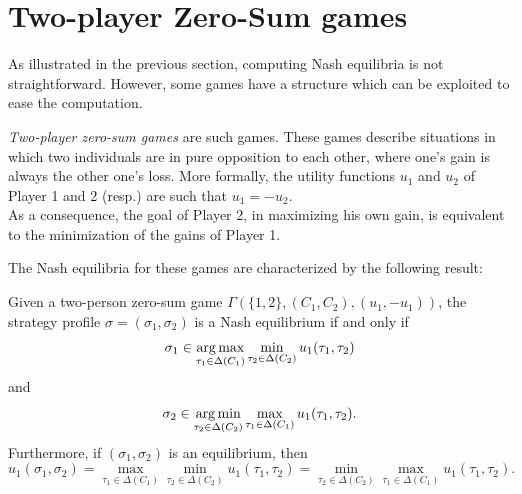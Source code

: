 %
%
%
%
%



\section{Two-player Zero-Sum games}

As illustrated in the previous section, computing Nash
 equilibria is not straightforward. However,
  some games have a structure which can be exploited
   to ease the computation.

\emph{Two-player zero-sum games} are such games.
 These games describe situations in which two individuals are
 in pure opposition to each other, where one's gain is always the
  other one's loss. More formally, the utility functions $u_1$ and $u_2$ of Player 1 and 2 (resp.) are such that $u_1 = - u_2$.\\
As a consequence, the goal of Player 2, in maximizing his own gain, is equivalent to the minimization of the gains of Player 1.

The Nash equilibria for these games are characterized by the following result:
\begin{theorem}
Given a two-person zero-sum game $\Gamma(\{1,2\}, (C_1, C_2), (u_1, -u_1))$, the strategy profile $\sigma = (\sigma_1, \sigma_2)$ is a Nash equilibrium if and only if
$$\sigma_1 \in \operatorname*{arg\,max}_{\tau_1 \in \Delta(C_1)} \min_{\tau_2 \in \Delta(C_2)} u_1(\tau_1, \tau_2) $$
and
$$\sigma_2 \in \operatorname*{arg\,min}_{\tau_2 \in \Delta(C_2)} \max_{\tau_1 \in \Delta(C_1)} u_1(\tau_1, \tau_2). $$
Furthermore, if $(\sigma_1, \sigma_2)$ is an equilibrium, then
$$u_1(\sigma_1, \sigma_2) = \max_{\tau_1 \in \Delta(C_1)} \min_{\tau_2 \in \Delta(C_2)} u_1(\tau_1, \tau_2) = \min_{\tau_2 \in  \Delta(C_2)} \max_{\tau_1 \in \Delta(C_1)}  u_1(\tau_1, \tau_2).$$
\label{chap3:thm:2P0S}
\end{theorem}

